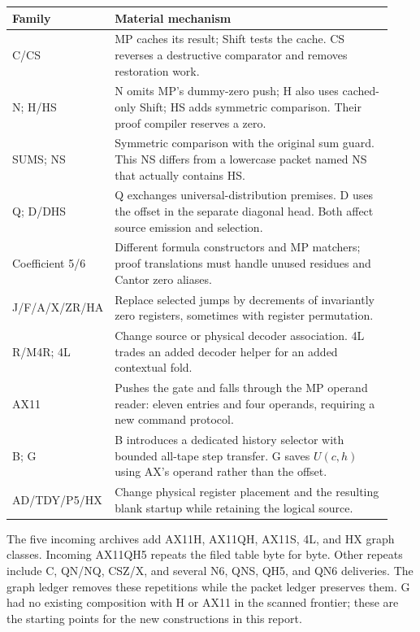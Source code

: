 \begin{center}\small
\begin{tabular}{@{}p{0.18\linewidth}p{0.75\linewidth}@{}}
\toprule
Family & Material mechanism\\
\midrule
C/CS & MP caches its result; Shift tests the cache. CS reverses a destructive
comparator and removes restoration work.\\
N; H/HS & N omits MP's dummy-zero push; H also uses cached-only Shift;
HS adds symmetric comparison. Their proof compiler reserves a zero.\\
SUMS; NS & Symmetric comparison with the original sum guard. This NS differs
from a lowercase packet named NS that actually contains HS.\\
Q; D/DHS & Q exchanges universal-distribution premises. D uses the offset
in the separate diagonal head. Both affect source emission and selection.\\
Coefficient 5/6 & Different formula constructors and MP matchers; proof
translations must handle unused residues and Cantor zero aliases.\\
J/F/A/X/ZR/HA & Replace selected jumps by decrements of invariantly zero
registers, sometimes with register permutation.\\
R/M4R; 4L & Change source or physical decoder association. 4L trades an
added decoder helper for an added contextual fold.\\
AX11 & Pushes the gate and falls through the MP operand reader: eleven
entries and four operands, requiring a new command protocol.\\
B; G & B introduces a dedicated history selector with bounded all-tape
step transfer. G saves $U(c,h)$ using AX's operand rather than the offset.\\
AD/TDY/P5/HX & Change physical register placement and the resulting blank
startup while retaining the logical source.\\
\bottomrule
\end{tabular}
\end{center}

The five incoming archives add AX11H, AX11QH, AX11S, 4L, and HX graph classes.
Incoming AX11QH5 repeats the filed table byte for byte. Other repeats include
C, QN/NQ, CSZ/X, and several N6, QNS, QH5, and QN6 deliveries. The graph
ledger removes these repetitions while the packet ledger preserves them.
G had no existing composition with H or AX11 in the scanned frontier;
these are the starting points for the new constructions in this report.

